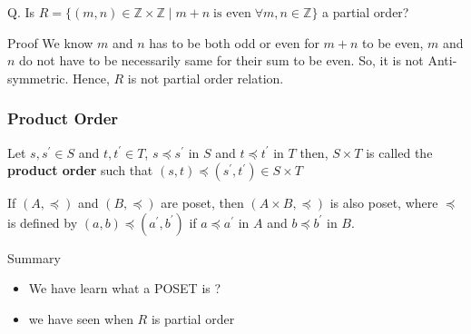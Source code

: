 \documentclass{beamer}
\begin{document}
\begin{frame}
\begin{example}
Q. Is $R=\{(m,n)\in \mathbb{Z}\times \mathbb{Z} \mid m+n\; \text{is even}\; \forall m,n \in \mathbb{Z}\}$ a partial order?
\end{example}
\begin{block}{Proof}
We know $m$ and $n$ has to be both odd or even for $m+n$ to be even, $m$ and $n$ do not have to be necessarily same for their sum to be even. So, it is not Anti-symmetric. Hence, $R$ is not partial order relation.
\end{block}
\end{frame}

\begin{frame}
\frametitle{Product Order}
\begin{definition}
Let $s,s^{'}\in S$ and $t,t^{'}\in T$, $s\preceq s^{'}$ in $S$ and $t\preceq t^{'}$ in $T$ then, $S\times T$ is called the \textbf{product order} such that $(s,t)\preceq (s^{'},t^{'})\in S\times T$
\end{definition}
\end{frame}

\begin{frame}
\begin{theorem}
If $(A,\preceq)$ and $(B,\preceq)$ are poset, then $(A\times B, \preceq)$ is also poset, where $\preceq$ is defined by $(a,b)\preceq (a^{'},b^{'})$ if $a\preceq a^{'}$ in $A$ and $b\preceq b^{'}$ in $B$.
\end{theorem}
\end{frame}

\begin{frame}
\begin{block}{Summary}
\begin{itemize}
\item We have learn what a POSET is ?
\item we have seen when $R$ is partial order
\end{itemize}
\end{block}
\end{frame}
\end{document}
